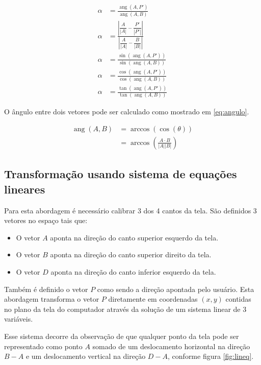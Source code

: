 \documentclass[brazil,pagestart=firstchapter]{abnt}
\DeclareMathOperator{\angulo}{ang}
\begin{document}
\begin{align}
\label{eq:alpha_angulo}
\alpha & = \frac{\angulo(A, P')}{\angulo(A, B)} \\
\label{eq:alpha_dist}
\alpha & = \frac{
		\left| \dfrac{A}{|A|} - \dfrac{P'}{|P'|} \right|
	}{
		\left| \dfrac{A}{|A|} - \dfrac{B }{|B |} \right|
	}  \\
\label{eq:alpha_sin}
\alpha & = \frac{\sin(\angulo(A, P'))}{\sin(\angulo(A, B))} \\
\label{eq:alpha_cos}
\alpha & = \frac{\cos(\angulo(A, P'))}{\cos(\angulo(A, B))} \\
\label{eq:alpha_tan}
\alpha & = \frac{\tan(\angulo(A, P'))}{\tan(\angulo(A, B))}
\end{align}

O ângulo entre dois vetores pode ser calculado como mostrado em
\eqref{eq:angulo}.

\begin{align}
\label{eq:angulo}
\angulo(A,B) & = \arccos( \cos(\theta) )    \\
             & = \arccos\left( \frac{A \cdot B}{|A||B|} \right)  \nonumber
\end{align}


\subsection{Transformação usando sistema de equações lineares}
\label{sub:coord_lineq}

Para esta abordagem é necessário calibrar 3 dos 4 cantos da tela. São
definidos 3 vetores no espaço tais que:

\begin{itemize}
\item O vetor $A$ aponta na direção do canto superior esquerdo da tela.
\item O vetor $B$ aponta na direção do canto superior direito da tela.
\item O vetor $D$ aponta na direção do canto inferior esquerdo da tela.
\end{itemize}

Também é definido o vetor $P$ como sendo a direção apontada pelo usuário.
Esta abordagem transforma o vetor $P$ diretamente em coordenadas $(x, y)$
contidas no plano da tela do computador através da solução de um sistema
linear de 3 variáveis.

Esse sistema decorre da observação de que qualquer ponto da tela pode ser
representado como ponto $A$ somado de um deslocamento horizontal na direção
$B-A$ e um deslocamento vertical na direção $D-A$, conforme figura
\ref{fig:lineq}.
\end{document}
